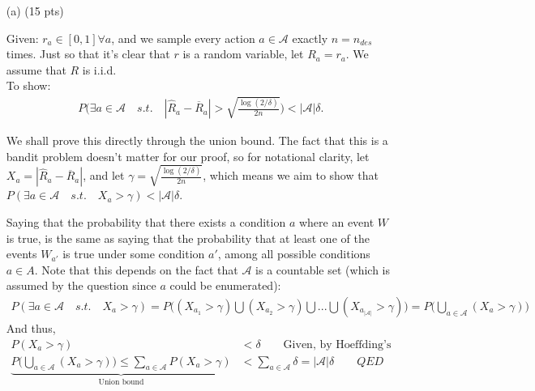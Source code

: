 \documentclass{article}
\begin{document}
\begin{enumerate}

\item[(a) (15 pts)]

Given: $r_a \in [0,1] \forall a$, and we sample every action $a \in \mathcal A$ exactly $n = n_{des}$ times. Just so that it's clear that $r$ is a random variable, let $R_a = r_a$. We assume that $R$ is i.i.d.\\

To show:
\begin{align*}
P\Bigg(\exists a \in \mathcal A \quad s.t. \quad |\widehat R_a - \overline R_a | > \sqrt{\frac{\log(2/\delta)}{2n}}\Bigg) < |\mathcal A|\delta.
\end{align*}

We shall prove this directly through the union bound. The fact that this is a bandit problem doesn't matter for our proof, so for notational clarity, let $X_a = |\widehat R_a - \overline R_a|$, and let $\gamma = \sqrt{\frac{\log(2/\delta)}{2n}}$, which means we aim to show that $P(\exists a \in \mathcal A \quad s.t. \quad X_a > \gamma) < |\mathcal A|\delta$.

Saying that the probability that there exists a condition $a$ where an event $W$ is true, is the same as saying that the probability that at least one of the events $W_{a'}$ is true under some condition $a'$, among all possible conditions $a \in A$. Note that this depends on the fact that $\mathcal A$ is a countable set (which is assumed by the question since $a$ could be enumerated):
\begin{align*}
P(\exists a \in \mathcal A \quad s.t. \quad X_a > \gamma) = P\bigg((X_{a_1}>\gamma) \bigcup (X_{a_2}>\gamma) \bigcup ... \bigcup (X_{a_{|\mathcal A|}}>\gamma)\bigg)= P\bigg( \bigcup\limits_{a \in \mathcal A}^{}(X_a > \gamma) \bigg)
\end{align*}
And thus,
\begin{align*}
P(X_a > \gamma) &< \delta \quad\quad \text{Given, by Hoeffding's inequality} \\
\underbrace{P\bigg( \bigcup\limits_{a \in \mathcal A}^{}(X_a > \gamma) \bigg) \leq \sum_{a \in \mathcal A}^{}P(X_a > \gamma)}_{\text{Union bound}} &< \sum_{a \in \mathcal A}^{}\delta = |\mathcal A|\delta \quad\quad QED
\end{align*} \\


\end{enumerate}
\end{document}
